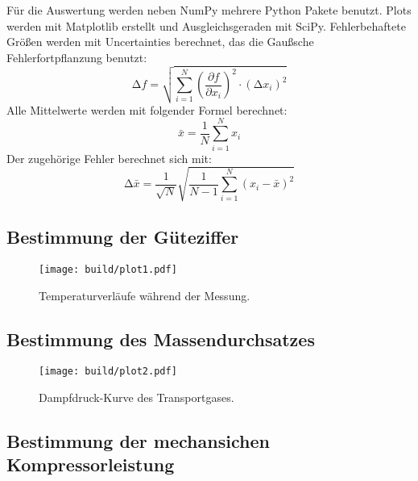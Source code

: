 Für die Auswertung werden neben NumPy\cite{numpy} mehrere Python Pakete benutzt.
Plots werden mit Matplotlib\cite{matplotlib} erstellt und Ausgleichsgeraden mit SciPy\cite{scipy}.
Fehlerbehaftete Größen werden mit Uncertainties\cite{uncertainties} berechnet, das die Gaußsche Fehlerfortpflanzung benutzt:
\begin{equation*}
    \increment f = \sqrt{\sum_{i=1}^N \left( \frac{\partial f}{\partial x_i} \right)^{2} \cdot (\increment x_i)^{2}}
\end{equation*}
Alle Mittelwerte werden mit folgender Formel berechnet:
\begin{equation*}
  \bar{x} = \frac{1}{N} \sum_{i = 1}^N x_i
\end{equation*}
Der zugehörige Fehler berechnet sich mit:
\begin{equation*}
  \increment \bar{x} = \frac{1}{\sqrt{N}} \sqrt{\frac{1}{N-1} \sum_{i = 1}^N (x_i - \bar{x})^2}
\end{equation*}

\subsection{Bestimmung der Güteziffer}



\begin{figure}
  \centering
  \texttt{[image: build/plot1.pdf]}
  \caption{Temperaturverläufe während der Messung.}
  \label{fig:plot1}
\end{figure}

\subsection{Bestimmung des Massendurchsatzes}


\begin{figure}
  \centering
  \texttt{[image: build/plot2.pdf]}
  \caption{Dampfdruck-Kurve des Transportgases.}
  \label{fig:plot2}
\end{figure}

\subsection{Bestimmung der mechansichen Kompressorleistung}
